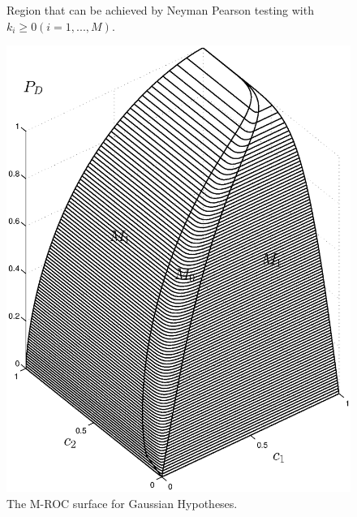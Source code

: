 \documentclass[12pt,journal,a4paper,twoside,doublecolumn]{IEEEtran}
\begin{document}
\begin{spacing}{1.0}
\begin{figure}[!t]
\caption{Region that can be achieved by Neyman Pearson testing with $k_i \geq 0 (i=1, ..., M)$.}
\label{pic: contour for m0 gaussian}
\end{figure}

\begin{figure}[!t]
\centering
\includegraphics[width=12cm]{ROC2.eps}
\caption{The M-ROC surface for Gaussian Hypotheses.}
\label{pic: LJS}
\end{figure}


\end{spacing}
\end{document}

